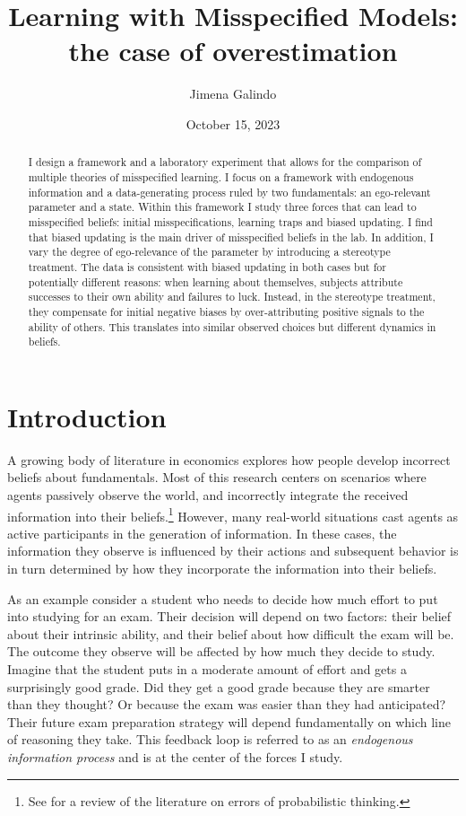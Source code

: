 \documentclass[
  12pt,
]{article}
\title{Learning with Misspecified Models: the case of overestimation}
\author{Jimena Galindo}
\date{October 15, 2023}
\begin{document}
\maketitle
\begin{abstract}
I design a framework and a laboratory experiment that allows for the
comparison of multiple theories of misspecified learning. I focus on a
framework with endogenous information and a data-generating process
ruled by two fundamentals: an ego-relevant parameter and a state. Within
this framework I study three forces that can lead to misspecified
beliefs: initial misspecifications, learning traps and biased updating.
I find that biased updating is the main driver of misspecified beliefs
in the lab. In addition, I vary the degree of ego-relevance of the
parameter by introducing a stereotype treatment. The data is consistent
with biased updating in both cases but for potentially different
reasons: when learning about themselves, subjects attribute successes to
their own ability and failures to luck. Instead, in the stereotype
treatment, they compensate for initial negative biases by
over-attributing positive signals to the ability of others. This
translates into similar observed choices but different dynamics in
beliefs.
\end{abstract}

\newpage

\hypertarget{introduction}{%
\section{Introduction}\label{introduction}}

A growing body of literature in economics explores how people develop
incorrect beliefs about fundamentals. Most of this research centers on
scenarios where agents passively observe the world, and incorrectly
integrate the received information into their
beliefs.\footnote{See \citet{benjamin2019} for a review of the literature on errors of 
probabilistic thinking.} However, many real-world situations cast agents
as active participants in the generation of information. In these cases,
the information they observe is influenced by their actions and
subsequent behavior is in turn determined by how they incorporate the
information into their beliefs.

As an example consider a student who needs to decide how much effort to
put into studying for an exam. Their decision will depend on two
factors: their belief about their intrinsic ability, and their belief
about how difficult the exam will be. The outcome they observe will be
affected by how much they decide to study. Imagine that the student puts
in a moderate amount of effort and gets a surprisingly good grade. Did
they get a good grade because they are smarter than they thought? Or
because the exam was easier than they had anticipated? Their future exam
preparation strategy will depend fundamentally on which line of
reasoning they take. This feedback loop is referred to as an
\emph{endogenous information 
process} and is at the center of the forces I study.
\end{document}

